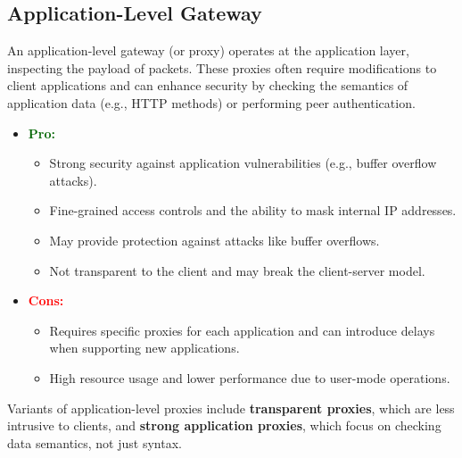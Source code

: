\subsection{Application-Level Gateway}
An application-level gateway (or proxy) operates at the application layer, inspecting the payload of packets. These proxies often require modifications to client applications and can enhance security by checking the semantics of application data (e.g., HTTP methods) or performing peer authentication.
\begin{itemize}
    \item \textcolor{darkgreen}{\textbf{Pro:}} 
    \begin{itemize}
        \item Strong security against application vulnerabilities (e.g., buffer overflow attacks).
        \item Fine-grained access controls and the ability to mask internal IP addresses.
        \item May provide protection against attacks like buffer overflows.
        \item Not transparent to the client and may break the client-server model.
    \end{itemize}
    \item \textcolor{red}{\textbf{Cons:}} 
    \begin{itemize}
        \item Requires specific proxies for each application and can introduce delays when supporting new applications.
        \item High resource usage and lower performance due to user-mode operations.
    \end{itemize}
\end{itemize} 
Variants of application-level proxies include \textbf{transparent proxies}, which are less intrusive to clients, and \textbf{strong application proxies}, which focus on checking data semantics, not just syntax.


